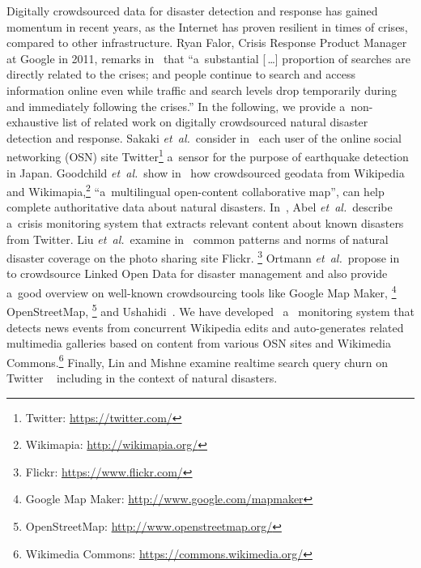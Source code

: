 \documentclass[letterpaper]{article}
\begin{document}
Digitally crowdsourced data for disaster detection and response
has gained momentum in recent years,
as the Internet has proven resilient in times of crises,
compared to other infrastructure.
Ryan Falor, Crisis Response Product Manager at Google in 2011,
remarks in~\cite{falor2011googleorg} that
``a~substantial \textup{[\,\dots]} proportion of searches
are directly related to the crises;
and people continue to search and access information online
even while traffic and search levels drop temporarily
during and immediately following the crises.''
In the following, we provide a~non-exhaustive list of related work
on digitally crowdsourced natural disaster detection and response.
Sakaki \emph{et~al.}\ consider in~\cite{sakaki2010earthquake} each user
of the online social networking (OSN) site
Twitter\footnote{Twitter: \url{https://twitter.com/}} a~sensor
for the purpose of earthquake detection in Japan.
Goodchild \emph{et~al.}\ show in~\cite{goodchild2010crowdsourcing}
how crowdsourced geodata from Wikipedia and
Wikimapia,\footnote{Wikimapia: \url{http://wikimapia.org/}}
``a~multilingual open-content collaborative map'',
can help complete authoritative data about natural disasters.
In~\cite{abel2012twitcident}, Abel \emph{et~al.}\ describe
a~crisis monitoring system that extracts relevant content
about known disasters from Twitter.
Liu \emph{et~al.}\ examine in~\cite{liu2008search}
common patterns and norms of natural disaster coverage
on the photo sharing site Flickr.%
\footnote{Flickr: \url{https://www.flickr.com/}}
Ortmann \emph{et~al.}\ propose in~\cite{ortmann2011disaster}
to crowdsource Linked Open Data for disaster management
and also provide a~good overview on well-known crowdsourcing tools
like  Google Map Maker,%
\footnote{Google Map Maker:
\url{http://www.google.com/mapmaker}}
OpenStreetMap,%
\footnote{OpenStreetMap: \url{http://www.openstreetmap.org/}}
and Ushahidi~\cite{okolloh2009ushahidi}.
We have developed~\cite{steiner2014thesis} a~ monitoring system
that detects news events from concurrent Wikipedia edits
and auto-generates related multimedia galleries
based on content from various OSN sites
and Wikimedia Commons.\footnote{Wikimedia Commons: \url{https://commons.wikimedia.org/}}
Finally, Lin and Mishne examine realtime search query churn on Twitter%
~\cite{lin2012churn} including in the context of natural disasters.
\end{document}
